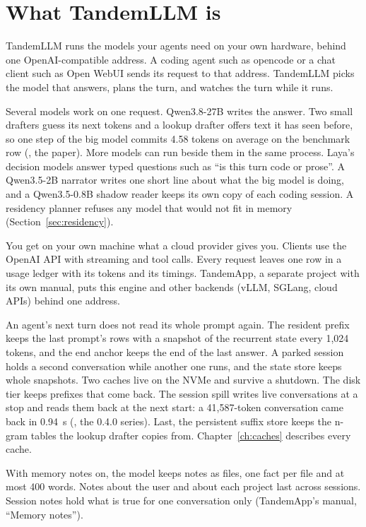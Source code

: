 \chapter{What TandemLLM is}\label{ch:intro}

TandemLLM runs the models your agents need on your own hardware, behind one OpenAI-compatible address. A coding agent such as opencode or a chat client such as Open WebUI sends its request to that address. TandemLLM picks the model that answers, plans the turn, and watches the turn while it runs.

Several models work on one request. Qwen3.8-27B writes the answer. Two small drafters guess its next tokens and a lookup drafter offers text it has seen before, so one step of the big model commits 4.58 tokens on average on the benchmark row (\measured, the paper). More models can run beside them in the same process. Laya's decision models answer typed questions such as \enquote{is this turn code or prose}. A Qwen3.5-2B narrator writes one short line about what the big model is doing, and a Qwen3.5-0.8B shadow reader keeps its own copy of each coding session. A residency planner refuses any model that would not fit in memory (Section~\ref{sec:residency}).

You get on your own machine what a cloud provider gives you. Clients use the OpenAI API with streaming and tool calls. Every request leaves one row in a usage ledger with its tokens and its timings. TandemApp, a separate project with its own manual, puts this engine and other backends (vLLM, SGLang, cloud APIs) behind one address.

An agent's next turn does not read its whole prompt again. The resident prefix keeps the last prompt's rows with a snapshot of the recurrent state every 1,024 tokens, and the end anchor keeps the end of the last answer. A parked session holds a second conversation while another one runs, and the state store keeps whole snapshots. Two caches live on the NVMe and survive a shutdown. The disk tier keeps prefixes that come back. The session spill writes live conversations at a stop and reads them back at the next start: a 41,587-token conversation came back in 0.94~s (\measured, the 0.4.0 series). Last, the persistent suffix store keeps the n-gram tables the lookup drafter copies from. Chapter~\ref{ch:caches} describes every cache.

With memory notes on, the model keeps notes as files, one fact per file and at most 400 words. Notes about the user and about each project last across sessions. Session notes hold what is true for one conversation only (TandemApp's manual, \enquote{Memory notes}).

